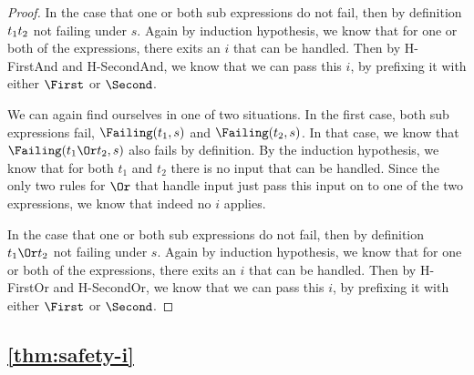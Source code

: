 \begin{proof}
{     In the case that one or both sub expressions do not fail, then by definition $t_1\relax t_2$ not failing under $s$.
     Again by induction hypothesis, we know that for one or both of the expressions, there exits an $i$ that can be handled.
     Then by H-FirstAnd and H-SecondAnd, we know that we can pass this $i$, by prefixing it with either $\First$ or $\Second$.}

     {We can again find ourselves in one of two situations.
     In the first case, both sub expressions fail, $\Failing(t_1,s)$ and $\Failing(t_2,s)$.
     In that case, we know that $\Failing(t_1\Or t_2,s)$ also fails by definition.
     By the induction hypothesis, we know that for both $t_1$ and $t_2$ there is no input that can be handled.
     Since the only two rules for $\Or$ that handle input just pass this input on to one of the two expressions, we know that indeed no $i$ applies.

     In the case that one or both sub expressions do not fail, then by definition $t_1\Or t_2$ not failing under $s$.
     Again by induction hypothesis, we know that for one or both of the expressions, there exits an $i$ that can be handled.
     Then by H-FirstOr and H-SecondOr, we know that we can pass this $i$, by prefixing it with either $\First$ or $\Second$.}

\end{proof}



\subsection{\cref{thm:safety-i}}

